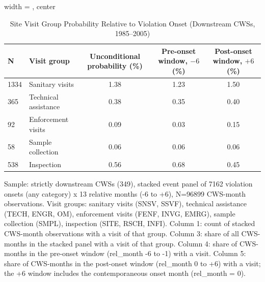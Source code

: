 \begin{table}[htbp]
\caption{\label{tab:visit_type_onset_summary} Site Visit Group Probability Relative to Violation Onset (Downstream CWSs, 1985--2005)}
\bigskip
\centering
\begin{adjustbox}{width = \textwidth, center}
\begin{tabular}{llccc}
\toprule
N & Visit group & Unconditional probability (\%) & Pre-onset window, $-6$ (\%) & Post-onset window, $+6$ (\%) \\
\midrule
1334 & Sanitary visits & 1.38 & 1.23 & 1.50 \\
365 & Technical assistance & 0.38 & 0.35 & 0.40 \\
92 & Enforcement visits & 0.09 & 0.03 & 0.15 \\
58 & Sample collection & 0.06 & 0.06 & 0.06 \\
538 & Inspection & 0.56 & 0.68 & 0.45 \\
\bottomrule
\end{tabular}
\end{adjustbox}
{\tiny\linespread{1}\selectfont \par \raggedright 
Sample: strictly downstream CWSs (349), stacked event panel of 7162 violation onsets (any category) x 13 relative months (-6 to +6), N=96899 CWS-month observations. Visit groups: sanitary visits (SNSV, SSVF), technical assistance (TECH, ENGR, OM), enforcement visits (FENF, INVG, EMRG), sample collection (SMPL), inspection (SITE, RSCH, INFI). Column 1: count of stacked CWS-month observations with a visit of that group. Column 3: share of all CWS-months in the stacked panel with a visit of that group. Column 4: share of CWS-months in the pre-onset window (rel\_month -6 to -1) with a visit. Column 5: share of CWS-months in the post-onset window (rel\_month 0 to +6) with a visit; the +6 window includes the contemporaneous onset month (rel\_month = 0).
}
\end{table}
